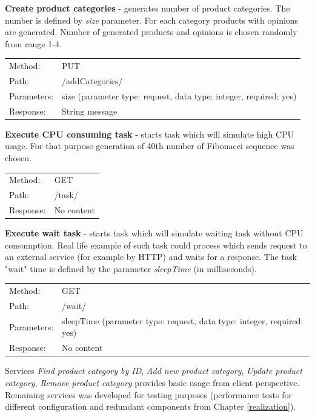 \documentclass[12pt,a4paper]{article}
\begin{document}
\noindent\textbf{Create product categories} - generates number of product categories. The number is defined by \textit{size} parameter. For each category products with opinions are generated. Number of generated products and opinions is chosen randomly from range 1-4. 

{\renewcommand{\arraystretch}{1}
  \begin{tabular}{ll}
  Method: & PUT \\
  Path: & /addCategories/ \\
  Parameters: & size (parameter type: request, data type: integer, required: yes)\\
  Response: & String message  \\
  \end{tabular} \vspace{5mm}
}

\noindent\textbf{Execute CPU consuming task} - starts task which will simulate high CPU usage. For that purpose generation of 40th number of Fibonacci sequence was chosen. 

{\renewcommand{\arraystretch}{1}
  \begin{tabular}{ll}
  Method: & GET \\
  Path: & /task/ \\
  Response: & No content  \\
  \end{tabular} \vspace{2mm}
}

\noindent\textbf{Execute wait task} - starts task which will simulate waiting task without CPU consumption. Real life example of such task could process which sends request to an external service (for example by HTTP) and waits for a response. The task "wait" time is defined by the parameter \textit{sleepTime} (in milliseconds). 

{\renewcommand{\arraystretch}{1}
  \begin{tabular}{ll}
  Method: & GET \\
  Path: & /wait/ \\
  Parameters: & sleepTime (parameter type: request, data type: integer, required: yes)\\
  Response: & No content  \\
  \end{tabular} \vspace{5mm}
}
  
Services \textit{Find product category by ID}, \textit{Add new product category}, \textit{Update product category}, \textit{Remove product category} provides basic usage from client perspective. Remaining services was developed for testing purposes (performance tests for different configuration and redundant components from Chapter \ref{realization}).
  
\end{document}
